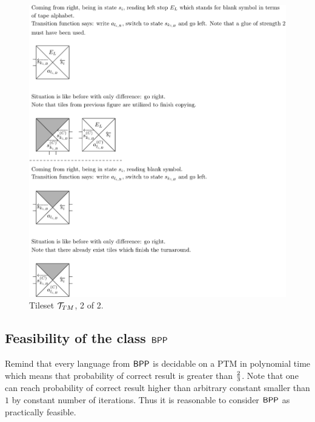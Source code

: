 	\begin{figure}[h]
	\begin{center}
		\includegraphics{./figures/turing_tiles/out2-1.pdf}
		\caption{Tileset ${\cal T}_{TM}$, 2 of 2.}
		\label{fig:tileset2}
	\end{center}
	\end{figure}

\subsection{Feasibility of the class $\mathsf{BPP}$}
	
	Remind that every language from $\mathsf{BPP}$ is decidable on a PTM in polynomial time which means that probability of correct result is greater than $\nicefrac{2}{3}$. Note that one can reach probability of correct result higher than arbitrary constant smaller than $1$ by constant number of iterations. Thus it is reasonable to consider $\mathsf{BPP}$ as practically feasible.   %
	
